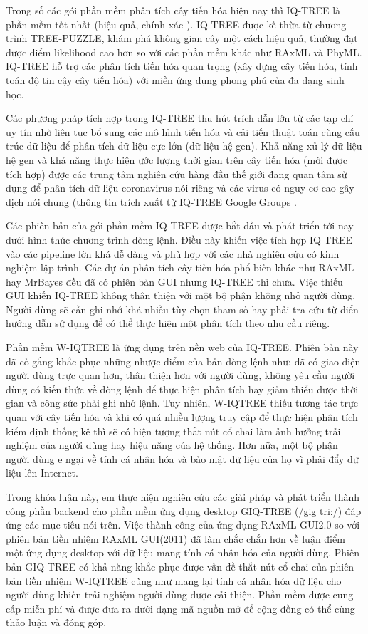 \documentclass[12pt]{report}
\begin{document}
Trong số các gói phần mềm phân tích cây tiến hóa hiện nay thì IQ-TREE là phần mềm tốt nhất (hiệu quả, chính xác \cite{cia-14} \cite{cia-15}). IQ-TREE được kế thừa từ chương trình TREE-PUZZLE\cite{cia-16}, khám phá không gian cây một cách hiệu quả, thường đạt được điểm likelihood cao hơn so với các phần mềm khác như RAxML và PhyML. IQ-TREE hỗ trợ các phân tích tiến hóa quan trọng (xây dựng cây tiến hóa, tính toán độ tin cậy cây tiến hóa) với miền ứng dụng phong phú của đa dạng sinh học. 

Các phương pháp tích hợp trong IQ-TREE thu hút trích dẫn lớn từ các tạp chí uy tín nhờ liên tục bổ sung các mô hình tiến hóa và cải tiến thuật toán cùng cấu trúc dữ liệu để phân tích dữ liệu cực lớn (dữ liệu hệ gen). Khả năng xử lý dữ liệu hệ gen và khả năng thực hiện ước lượng thời gian trên cây tiến hóa (mới được tích hợp) được các trung tâm nghiên cứu hàng đầu thế giới đang quan tâm sử dụng để phân tích dữ liệu coronavirus nói riêng và các virus có nguy cơ cao gây dịch nói chung (thông tin trích xuất từ IQ-TREE Google Groups \cite{cia-19}.

Các phiên bản của gói phần mềm IQ-TREE được bắt đầu và phát triển tới nay dưới hình thức chương trình dòng lệnh. Điều này khiến việc tích hợp IQ-TREE vào các pipeline lớn khá dễ dàng và phù hợp với các nhà nghiên cứu có kinh nghiệm lập trình. Các dự án phân tích cây tiến hóa phổ biến khác như RAxML hay MrBayes đều đã có phiên bản GUI nhưng IQ-TREE thì chưa. Việc thiếu GUI khiến IQ-TREE không thân thiện với một bộ phận không nhỏ người dùng. Người dùng sẽ cần ghi nhớ khá nhiều tùy chọn tham số hay phải tra cứu từ điển hướng dẫn sử dụng để có thể thực hiện một phân tích theo nhu cầu riêng. 

Phần mềm W-IQTREE là ứng dụng trên nền web của IQ-TREE. Phiên bản này đã cố gắng khắc phục những nhược điểm của bản dòng lệnh như: đã có giao diện người dùng trực quan hơn, thân thiện hơn với người dùng, không yêu cầu người dùng có kiến thức về dòng lệnh để thực hiện phân tích hay giảm thiểu được thời gian và công sức phải ghi nhớ lệnh. Tuy nhiên, W-IQTREE thiếu tương tác trực quan với cây tiến hóa và khi có quá nhiều lượng truy cập để thực hiện phân tích kiểm định thống kê thì sẽ có hiện tượng thắt nút cổ chai làm ảnh hưởng trải nghiệm của người dùng hay hiệu năng của hệ thống. Hơn nữa, một bộ phận người dùng e ngại về tính cá nhân hóa và bảo mật dữ liệu của họ vì phải đẩy dữ liệu lên Internet.

Trong khóa luận này, em thực hiện nghiên cứu các giải pháp và phát triển thành công phần backend cho phần mềm ứng dụng desktop GIQ-TREE (/gig tri:/) đáp ứng các mục tiêu nói trên. Việc thành công của ứng dụng RAxML GUI2.0 so với phiên bản tiền nhiệm RAxML GUI(2011) đã làm chắc chắn hơn về luận điểm một ứng dụng desktop với dữ liệu mang tính cá nhân hóa của người dùng. Phiên bản GIQ-TREE có khả năng khắc phục được vấn đề thắt nút cổ chai của phiên bản tiền nhiệm W-IQTREE cũng như mang lại tính cá nhân hóa dữ liệu cho người dùng khiến trải nghiệm người dùng được cải thiện. Phần mềm được cung cấp miễn phí và được đưa ra dưới dạng mã nguồn mở để cộng đồng có thể cùng thảo luận và đóng góp.
\end{document}
